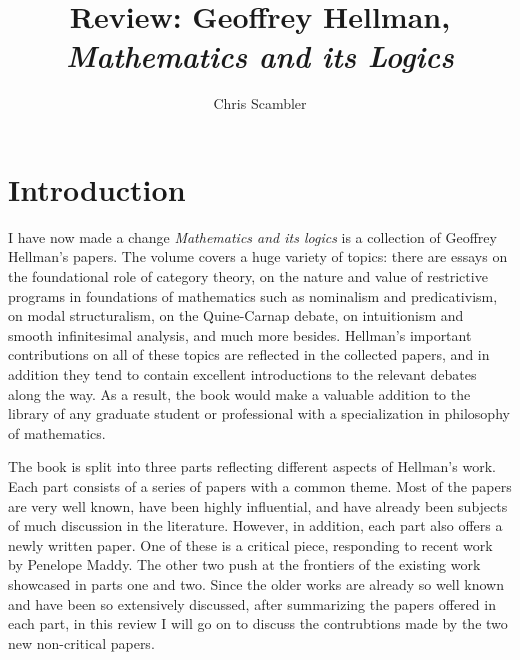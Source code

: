 \documentclass{asl}
\title{Review: Geoffrey Hellman, \emph{Mathematics and its Logics}}
\author{Chris Scambler}
\theoremstyle{definition}
\begin{document}
 
\maketitle

\section{Introduction}
I have now made a change
\emph{Mathematics and its logics} is a collection of Geoffrey Hellman's papers. 
The volume covers a huge variety of topics:
there are essays on the foundational role of category theory, 
on the nature and value of restrictive programs in foundations of mathematics such as nominalism and predicativism, 
on modal structuralism, on the Quine-Carnap debate, 
on intuitionism and smooth infinitesimal analysis, 
and much more besides. 
Hellman's important contributions on all of these topics are reflected in the collected papers, 
and in addition they tend to contain excellent introductions to the relevant debates along the way.
As a result, 
the book would make a valuable addition to the library of any graduate student or professional with a specialization in philosophy of mathematics. 

The book is split into three parts reflecting different aspects of Hellman's work. 
Each part consists of a series of papers with a common theme.
Most of the papers are very well known, have been highly influential, 
and have already been subjects of much discussion in the literature.
However, in addition, 
each part also offers a newly written paper.
One of these is a critical piece, responding to recent work by Penelope Maddy. 
The other two push at the frontiers of the existing work showcased in parts one and two.
Since the older works are already so well known and have been so extensively discussed, 
after summarizing the papers offered in each part, 
in this review I will go on to discuss the contrubtions made by the two new non-critical papers.
\end{document}

